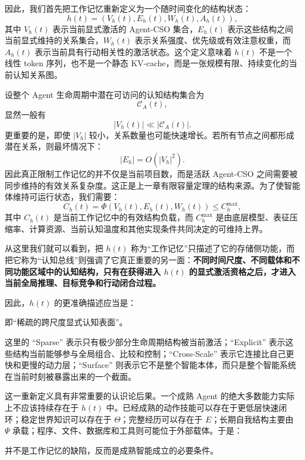 因此，我们首先把工作记忆重新定义为一个随时间变化的结构状态：
\[
h(t)=
\left(
V_h(t),
E_h(t),
W_h(t),
A_h(t)
\right),
\]
其中 $V_h(t)$ 表示当前显式激活的 Agent-CSO 集合，$E_h(t)$ 表示这些结构之间当前显式维持的关系集合，$W_h(t)$ 表示关系强度、优先级或有效注意权重，而 $A_h(t)$ 表示当前具有行动相关性的激活状态。这个定义意味着 $h(t)$ 不是一个线性 token 序列，也不是一个静态 KV-cache，而是一张规模有限、持续变化的当前认知关系图。

设整个 Agent 生命周期中潜在可访问的认知结构集合为
\[
\mathcal C_A(t),
\]
显然一般有
\[
|V_h(t)|\ll |\mathcal C_A(t)|.
\]
更重要的是，即使 $|V_h|$ 较小，关系数量也可能快速增长。若所有节点之间都形成潜在关系，则最坏情况下：
\[
|E_h|
=
O(|V_h|^2).
\]
因此真正限制工作记忆的并不仅是当前项目数，而是活跃 Agent-CSO 之间需要被同步维持的有效关系复杂度。这正是上一章有限容量定理的结构来源。为了使智能体维持可运行状态，我们需要：
\[
C_h(t)
=
\Phi
\left(
V_h(t),
E_h(t),
W_h(t)
\right)
\leq C_h^{\max},
\]
其中 $C_h(t)$ 是当前工作记忆中的有效结构负载，而 $C_h^{\max}$ 是由底层模型、表征压缩率、计算资源、当前认知温度和其他实现条件共同决定的可维持上界。

从这里我们就可以看到，把 $h(t)$ 称为“工作记忆”只描述了它的存储侧功能，而把它称为“认知总线”则强调了它真正重要的另一面：\textbf{不同时间尺度、不同载体和不同功能区域中的认知结构，只有在获得进入 $h(t)$ 的显式激活资格之后，才进入当前全局推理、目标竞争和行动闭合过程。}

因此，$h(t)$ 的更准确描述应当是：
\begin{statementbox}
\centering
{}
\end{statementbox}
即“稀疏的跨尺度显式认知表面”。

这里的 ``Sparse'' 表示只有极少部分生命周期结构被当前激活；``Explicit'' 表示这些结构当前能够参与全局组合、比较和控制；``Cross-Scale'' 表示它连接比自己更快和更慢的动力层；``Surface'' 则表示它不是整个智能本体，而只是整个智能系统在当前时刻被暴露出来的一个截面。

这一重新定义具有非常重要的认识论后果。一个成熟 Agent 的绝大多数能力实际上不应该持续存在于 $h(t)$ 中。已经成熟的动作技能可以存在于更低层快速闭环；稳定世界知识可以存在于 $\Theta$；完整经历可以存在于 $E$；长期自我结构主要由 $\Psi$ 承载；程序、文件、数据库和工具则可能位于外部载体。于是：
\begin{statementbox}
\centering
{}
\end{statementbox}
并不是工作记忆的缺陷，反而是成熟智能成立的必要条件。

